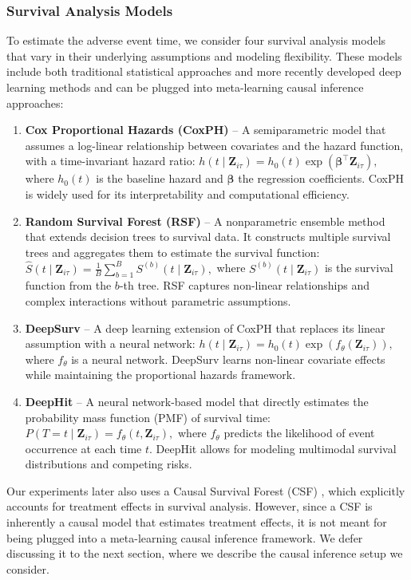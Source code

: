 \subsubsection{Survival Analysis Models}
\label{ch03:sec:methods_survival}
To estimate the adverse event time, we consider four survival analysis models that vary in their underlying assumptions and modeling flexibility. 
These models include both traditional statistical approaches and more recently developed deep learning methods and can be plugged into meta-learning causal inference approaches:
\begin{enumerate}\setlength{\itemsep}{0pt}
    \item \textbf{Cox Proportional Hazards (CoxPH)} \citep{cox1972regression} – A semiparametric model that assumes a log-linear relationship between covariates and the hazard function, with a time-invariant hazard ratio:
    \(
    h(t \mid \mathbf{Z}_{i\tau}) = h_0(t) \exp(\boldsymbol{\beta}^{\top} \mathbf{Z}_{i\tau}),
    \)
    where \( h_0(t) \) is the baseline hazard and \( \boldsymbol{\beta} \) the regression coefficients.
CoxPH is widely used for its interpretability and computational efficiency.

    \item \textbf{Random Survival Forest (RSF)} \citep{ishwaran2008random} – A nonparametric ensemble method that extends decision trees to survival data.
It constructs multiple survival trees and aggregates them to estimate the survival function:
    \(
    \widehat{S}(t \mid \mathbf{Z}_{i\tau}) = \frac{1}{B} \sum_{b=1}^{B} S^{(b)}(t \mid \mathbf{Z}_{i\tau}),
    \)
    where \( S^{(b)}(t \mid \mathbf{Z}_{i\tau}) \) is the survival function from the \( b \)-th tree.
RSF captures non-linear relationships and complex interactions without parametric assumptions.

    \item \textbf{DeepSurv} \citep{katzman2018deepsurv} – A deep learning extension of CoxPH that replaces its linear assumption with a neural network:
    \(
    h(t \mid \mathbf{Z}_{i\tau}) = h_0(t) \exp(f_{\theta}(\mathbf{Z}_{i\tau})),
    \)
    where \( f_{\theta} \) is a neural network.
DeepSurv learns non-linear covariate effects while maintaining the proportional hazards framework.

    \item \textbf{DeepHit} \citep{lee2018deephit} – A neural network-based model that directly estimates the probability mass function (PMF) of survival time:
    \(
    P(T = t \mid \mathbf{Z}_{i\tau}) = f_{\theta}(t, \mathbf{Z}_{i\tau}),
    \)
    where \( f_{\theta} \) predicts the likelihood of event occurrence at each time \( t \).
DeepHit allows for modeling multimodal survival distributions and competing risks.
\end{enumerate}
Our experiments later also uses a Causal Survival Forest (CSF) \citep{cui2023estimating}, which explicitly accounts for treatment effects in survival analysis.
However, since a CSF is inherently a causal model that estimates treatment effects, it is not meant for being plugged into a meta-learning causal inference framework.
We defer discussing it to the next section, where we describe the causal inference setup we consider. 

